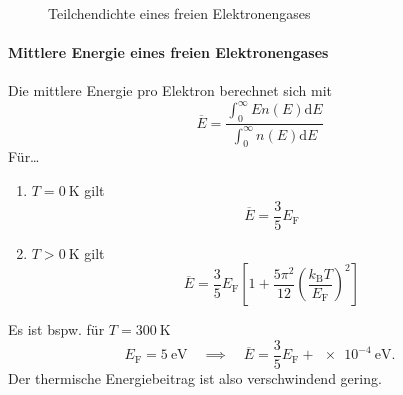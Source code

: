 	\begin{figure}[H]
		\centering
		\caption{Teilchendichte eines freien Elektronengases}
		\label{fig:vl25_abbildung_7}
	\end{figure}

\paragraph{Mittlere Energie eines freien Elektronengases}
	Die mittlere Energie pro Elektron berechnet sich mit
	$$
	\overline{E} = \frac{\int_{0}^{\infty} E n(E) \mathrm{d}E}{\int_{0}^{\infty} n(E) \mathrm{d}E} 
	$$ 
	Für\ldots
	\begin{enumerate}
		\item $T=\SI{0}{\kelvin}$ gilt 
			\begin{equation}
				\label{eq:II.7.15}
				\overline{E} = \frac{3}{5} E_{\mathrm{F}}
			\end{equation}
		\item $T>\SI{0}{\kelvin}$ gilt
			\begin{equation}
				\label{eq:II.7.16}
				\overline{E} = \frac{3}{5} E_{\mathrm{F}} \left[ 1 + \frac{5\pi^2}{12} \left( \frac{k_{\mathrm{B}}T}{E_{\mathrm{F}}} \right) ^2 \right]
			\end{equation}
	\end{enumerate}
	Es ist bspw. für $T= \SI{300}{\kelvin}$ 
	$$
	E_{\mathrm{F}} = \SI{5}{\electronvolt}\quad \implies\quad \overline{E} = \frac{3}{5} E_{\mathrm{F}} + \SI{e-4}{\electronvolt}.
	$$ 
	Der thermische Energiebeitrag ist also verschwindend gering.
